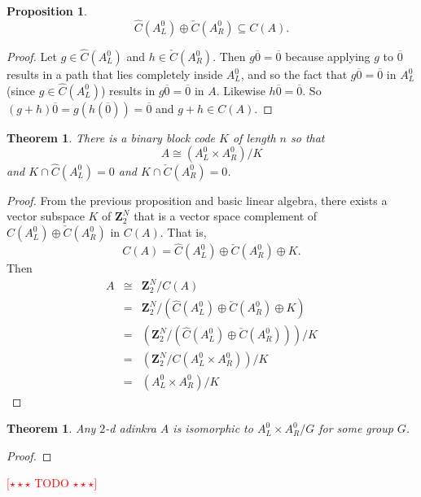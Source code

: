 \documentclass[12pt,twoside,singlespace]{article}
\numberwithin{equation}{section}
\newtheorem{thm}[equation]{Theorem}
\newtheorem{prop}[equation]{Proposition}
\theoremstyle{definition}
\newcommand{\ZZ}{\mathbf{Z}}
\newcommand{\com}[1]{\textcolor{red}{$[\star \star \star$ #1 $\star \star \star]$}}
\begin{document}
\begin{prop}
\[\hat{C}(A_L^0)\oplus \check{C}(A_R^0) \subseteq C(A).\]
\end{prop}
\begin{proof}
Let $g\in\hat{C}(A_L^0)$ and $h\in \check{C}(A_R^0)$.  Then $g\overline{0}=\overline{0}$ because applying $g$ to $\overline{0}$ results in a path that lies completely inside $A_L^0$, and so the fact that $g\overline{0}=\overline{0}$ in $A_L^0$ (since $g\in \hat{C}(A_L^0)$) results in $g\overline{0}=\overline{0}$ in $A$.  Likewise $h\overline{0}=\overline{0}$.  So $(g+h)\overline{0}=g(h(\overline{0}))=\overline{0}$ and $g+h\in C(A)$.
\end{proof}

\begin{thm}
There is a binary block code $K$ of length $n$ so that
\[A\cong (A_L^0\times A_R^0)/K\]
and $K\cap \hat{C}(A_L^0)=0$ and $K\cap \check{C}(A_R^0)=0$.
\end{thm}
\begin{proof}
From the previous proposition and basic linear algebra, there exists a vector subspace $K$ of $\ZZ_2^N$ that is a vector space complement of
$\hat{C}(A_L^0)\oplus \check{C}(A_R^0)$ in $C(A)$.  That is,
\[C(A)=\hat{C}(A_L^0)\oplus \check{C}(A_R^0)\oplus K.\]
Then
\begin{eqnarray*}
A&\cong& \ZZ_2^N/C(A)\\
&=&\ZZ_2^N/(\hat{C}(A_L^0)\oplus \check{C}(A_R^0)\oplus K)\\
&=&(\ZZ_2^N/(\hat{C}(A_L^0)\oplus \check{C}(A_R^0)))/ K\\
&=&(\ZZ_2^N/C(A_L^0 \times A_R^0))/ K\\
&=&(A_L^0 \times A_R^0)/ K
\end{eqnarray*}


\end{proof}



\begin{thm}
\label{thm:quotient}
Any $2$-d adinkra $A$ is isomorphic to $A_L^0 \times A_R^0 / G$ for some group $G$. 
\end{thm}
\begin{proof}
\end{proof}

\com{TODO}
\end{document}
